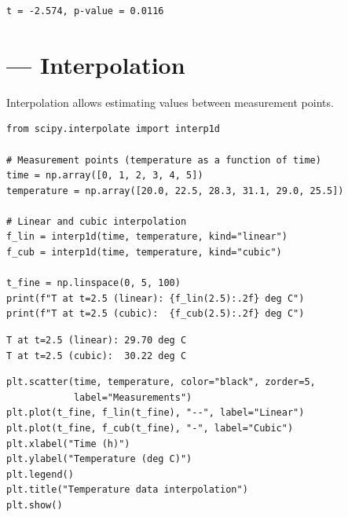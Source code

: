 \begin{codeoutput}
\begin{verbatim}
t = -2.574, p-value = 0.0116
\end{verbatim}
\end{codeoutput}

\section{ --- Interpolation}

Interpolation allows estimating values between measurement points.

\begin{codeblock}[title=\textbf{Python}]
\begin{verbatim}
from scipy.interpolate import interp1d

# Measurement points (temperature as a function of time)
time = np.array([0, 1, 2, 3, 4, 5])
temperature = np.array([20.0, 22.5, 28.3, 31.1, 29.0, 25.5])

# Linear and cubic interpolation
f_lin = interp1d(time, temperature, kind="linear")
f_cub = interp1d(time, temperature, kind="cubic")

t_fine = np.linspace(0, 5, 100)
print(f"T at t=2.5 (linear): {f_lin(2.5):.2f} deg C")
print(f"T at t=2.5 (cubic):  {f_cub(2.5):.2f} deg C")
\end{verbatim}
\end{codeblock}

\begin{codeoutput}
\begin{verbatim}
T at t=2.5 (linear): 29.70 deg C
T at t=2.5 (cubic):  30.22 deg C
\end{verbatim}
\end{codeoutput}

\begin{codeblock}[title=\textbf{Python}]
\begin{verbatim}
plt.scatter(time, temperature, color="black", zorder=5,
            label="Measurements")
plt.plot(t_fine, f_lin(t_fine), "--", label="Linear")
plt.plot(t_fine, f_cub(t_fine), "-", label="Cubic")
plt.xlabel("Time (h)")
plt.ylabel("Temperature (deg C)")
plt.legend()
plt.title("Temperature data interpolation")
plt.show()
\end{verbatim}
\end{codeblock}

